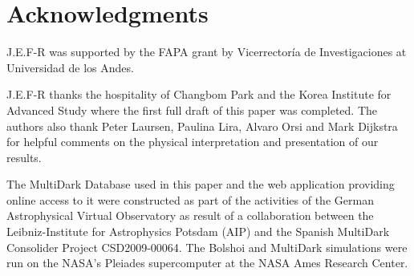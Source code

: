 \documentclass{emulateapj}
\begin{document}
\section*{Acknowledgments} 

J.E.F-R was supported by the FAPA grant by Vicerrector\'ia de
Investigaciones at Universidad de los Andes.  

J.E.F-R thanks the hospitality of Changbom Park and the Korea
Institute for Advanced Study where the first full draft of this paper
was completed. The authors also thank Peter Laursen, Paulina Lira, 
Alvaro Orsi and Mark Dijkstra for helpful comments on the physical
interpretation and presentation of our results. 


The MultiDark Database used in this paper and the web application providing online access to it were constructed as part of the
activities of the German Astrophysical Virtual Observatory as result
of a collaboration between the Leibniz-Institute for Astrophysics
Potsdam (AIP) and the Spanish MultiDark Consolider Project
CSD2009-00064. The Bolshoi and MultiDark simulations were run on the
NASA's Pleiades supercomputer at the NASA Ames Research Center.





\end{document}
